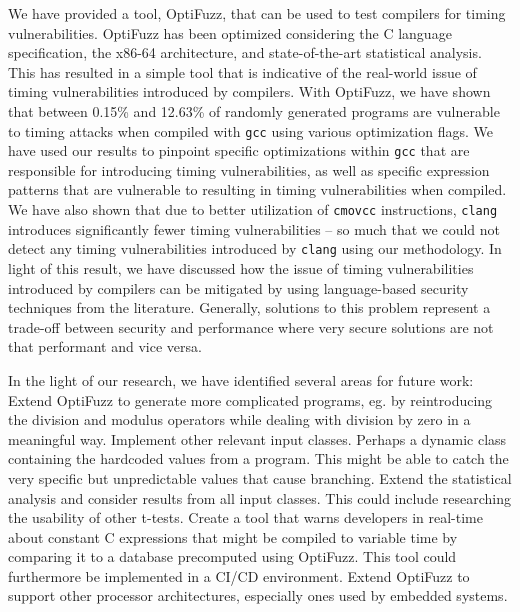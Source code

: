
We have provided a tool, OptiFuzz, that can be used to test compilers for timing vulnerabilities.
OptiFuzz has been optimized considering the C language specification, the x86-64 architecture, and state-of-the-art statistical analysis.
This has resulted in a simple tool that is indicative of the real-world issue of timing vulnerabilities introduced by compilers.
With OptiFuzz, we have shown that between 0.15\% and 12.63\% of randomly generated programs are vulnerable to timing attacks when compiled with \texttt{gcc} using various optimization flags.
We have used our results to pinpoint specific optimizations within \texttt{gcc} that are responsible for introducing timing vulnerabilities, as well as specific expression patterns that are vulnerable to resulting in timing vulnerabilities when compiled.
We have also shown that due to better utilization of \texttt{cmovcc} instructions, \texttt{clang} introduces significantly fewer timing vulnerabilities -- so much that we could not detect any timing vulnerabilities introduced by \texttt{clang} using our methodology.
In light of this result, we have discussed how the issue of timing vulnerabilities introduced by compilers can be mitigated by using language-based security techniques from the literature.
Generally, solutions to this problem represent a trade-off between security and performance where very secure solutions are not that performant and vice versa.

In the light of our research, we have identified several areas for future work:
Extend OptiFuzz to generate more complicated programs, eg. by reintroducing the division and modulus operators while dealing with division by zero in a meaningful way.
Implement other relevant input classes. Perhaps a dynamic class containing the hardcoded values from a program. This might be able to catch the very specific but unpredictable values that cause branching.
Extend the statistical analysis and consider results from all input classes. This could include researching the usability of other t-tests.
Create a tool that warns developers in real-time about constant C expressions that might be compiled to variable time by comparing it to a database precomputed using OptiFuzz. This tool could furthermore be implemented in a CI/CD environment.
Extend OptiFuzz to support other processor architectures, especially ones used by embedded systems.
